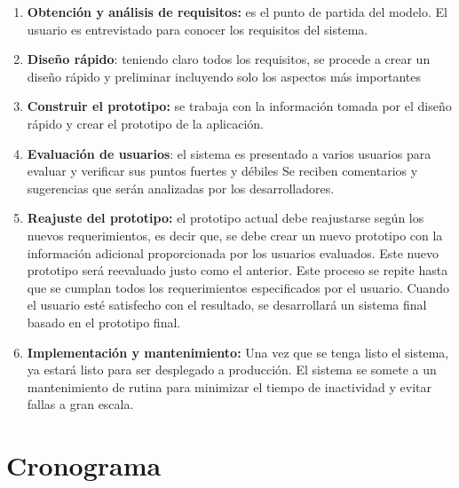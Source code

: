 \documentclass[12pt, openany, xcolor=table]{book}
\begin{document}
	\begin{enumerate}
		\item \textbf{Obtención y análisis de requisitos:} es el punto de partida del modelo. El usuario es entrevistado para conocer los requisitos del sistema.
		
		\item \textbf{Diseño rápido}: teniendo claro todos los requisitos, se procede a crear un diseño rápido y preliminar incluyendo solo los aspectos más importantes 
		
		\item\textbf{ Construir el prototipo:} se trabaja con la información tomada por el diseño rápido y crear el prototipo de la aplicación.
		
		\item \textbf{Evaluación de usuarios}: el sistema es presentado a varios usuarios para evaluar y verificar sus puntos fuertes y débiles Se reciben comentarios y sugerencias que serán analizadas por los desarrolladores.
		
		\item \textbf{Reajuste del prototipo:} el prototipo actual debe reajustarse según los nuevos requerimientos, es decir que, se debe crear un nuevo prototipo con la información adicional proporcionada por los usuarios evaluados. Este nuevo prototipo será reevaluado justo como el anterior. Este proceso se repite hasta que se cumplan todos los requerimientos especificados por el usuario. Cuando el usuario esté satisfecho con el resultado, se desarrollará un sistema final basado en el prototipo final. 
		
		\item \textbf{Implementación y mantenimiento:} Una vez que se tenga listo el sistema, ya estará listo para ser desplegado a producción. El sistema se somete a un mantenimiento de rutina para minimizar el tiempo de inactividad y evitar fallas a gran escala.
		
	\end{enumerate}
	
	\section{Cronograma}
	
\end{document}
